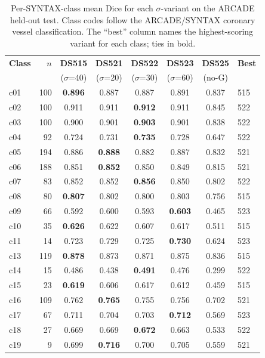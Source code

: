 \documentclass[12pt]{article}
\begin{document}
\begin{table}[!htb]
\centering
\small
\caption{Per-SYNTAX-class mean Dice for each $\sigma$-variant on the ARCADE
held-out test. Class codes follow the ARCADE/SYNTAX coronary vessel
classification. The ``best'' column names the highest-scoring variant for each
class; ties in bold.}
\label{tab:sigma_class}
\begin{tabular}{lrcccccl}
\toprule
\textbf{Class} & \textbf{$n$} & \textbf{DS515} & \textbf{DS521} & \textbf{DS522} & \textbf{DS523} & \textbf{DS525} & \textbf{Best} \\
& & ($\sigma$=40) & ($\sigma$=20) & ($\sigma$=30) & ($\sigma$=60) & (no-G) & \\
\midrule
c01 & 100 & \textbf{0.896} & 0.887 & 0.887 & 0.891 & 0.837 & 515 \\
c02 & 100 & 0.911 & 0.911 & \textbf{0.912} & 0.911 & 0.845 & 522 \\
c03 & 100 & 0.900 & 0.901 & \textbf{0.903} & 0.901 & 0.838 & 522 \\
c04 &  92 & 0.724 & 0.731 & \textbf{0.735} & 0.728 & 0.647 & 522 \\
c05 & 194 & 0.886 & \textbf{0.888} & 0.882 & 0.887 & 0.832 & 521 \\
c06 & 188 & 0.851 & \textbf{0.852} & 0.850 & 0.849 & 0.815 & 521 \\
c07 &  83 & 0.852 & 0.852 & \textbf{0.856} & 0.850 & 0.802 & 522 \\
c08 &  80 & \textbf{0.807} & 0.802 & 0.800 & 0.803 & 0.756 & 515 \\
c09 &  66 & 0.592 & 0.600 & 0.593 & \textbf{0.603} & 0.465 & 523 \\
c10 &  35 & \textbf{0.626} & 0.622 & 0.607 & 0.617 & 0.511 & 515 \\
c11 &  14 & 0.723 & 0.729 & 0.725 & \textbf{0.730} & 0.624 & 523 \\
c13 & 119 & \textbf{0.878} & 0.873 & 0.871 & 0.875 & 0.836 & 515 \\
c14 &  15 & 0.486 & 0.438 & \textbf{0.491} & 0.476 & 0.299 & 522 \\
c15 &  23 & \textbf{0.619} & 0.606 & 0.617 & 0.612 & 0.459 & 515 \\
c16 & 109 & 0.762 & \textbf{0.765} & 0.755 & 0.756 & 0.702 & 521 \\
c17 &  67 & 0.711 & 0.704 & 0.703 & \textbf{0.712} & 0.569 & 523 \\
c18 &  27 & 0.669 & 0.669 & \textbf{0.672} & 0.663 & 0.533 & 522 \\
c19 &   9 & 0.699 & \textbf{0.716} & 0.700 & 0.705 & 0.559 & 521 \\

\end{tabular}
\end{table}
\end{document}
